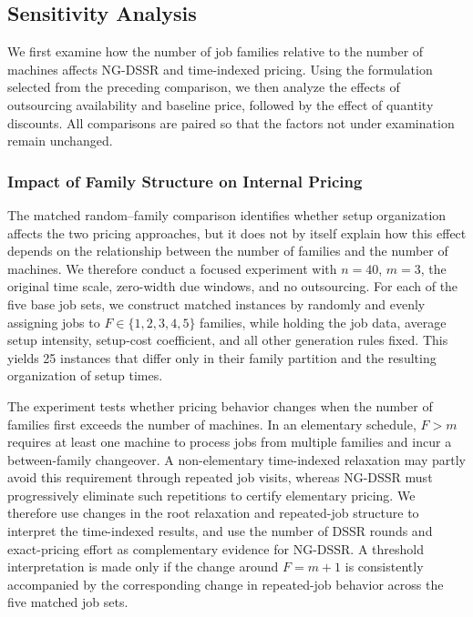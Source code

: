 \subsection{Sensitivity Analysis}\label{sec:sensitivity-analysis}

We first examine how the number of job families relative to the number of machines
affects NG-DSSR and time-indexed pricing. Using the formulation selected from the
preceding comparison, we then analyze the effects of outsourcing availability and
baseline price, followed by the effect of quantity discounts. All comparisons are
paired so that the factors not under examination remain unchanged.

\subsubsection{Impact of Family Structure on Internal Pricing}
\label{sec:family-pricing-impact}

The matched random--family comparison identifies whether setup organization affects
the two pricing approaches, but it does not by itself explain how this effect depends
on the relationship between the number of families and the number of machines. We
therefore conduct a focused experiment with $n=40$, $m=3$, the original time scale,
zero-width due windows, and no outsourcing. For each of the five base job sets, we
construct matched instances by randomly and evenly assigning jobs to
$F\in\{1,2,3,4,5\}$ families,
while holding the job data, average setup intensity, setup-cost coefficient, and all
other generation rules fixed. This yields 25 instances that differ only in
their family partition and the resulting organization of setup times.

The experiment tests whether pricing behavior changes when the number of families
first exceeds the number of machines. In an elementary schedule, $F>m$ requires at
least one machine to process jobs from multiple families and incur a between-family
changeover. A non-elementary time-indexed relaxation may partly avoid this requirement
through repeated job visits, whereas NG-DSSR must progressively eliminate such
repetitions to certify elementary pricing. We therefore use changes in the root
relaxation and repeated-job structure to interpret the time-indexed results, and use
the number of DSSR rounds and exact-pricing effort as complementary evidence for
NG-DSSR. A threshold interpretation is made only if the change around $F=m+1$ is
consistently accompanied by the corresponding change in repeated-job behavior across
the five matched job sets.

